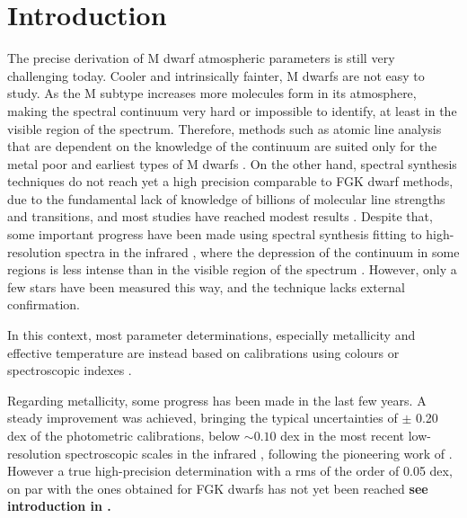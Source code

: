 \documentclass{aa}
\begin{document}

   \maketitle


\section{Introduction}

The precise derivation of M dwarf atmospheric parameters is still very challenging today. Cooler and intrinsically fainter, M dwarfs are not easy to study. As the M subtype increases more molecules form in its atmosphere, making the spectral continuum very hard or impossible to identify, at least in the visible region of the spectrum. Therefore, methods such as atomic line analysis that are dependent on the knowledge of the continuum are suited only for the metal poor and earliest types of M dwarfs \citep[e.g.][]{Woolf-2005,Woolf-2006}. On the other hand, spectral synthesis techniques do not reach yet a high precision comparable to FGK dwarf methods, due to the fundamental lack of knowledge of billions of molecular line strengths and transitions, and most studies have reached modest results \citep[e.g.][]{Valenti-1998,Bean-2006a}. Despite that, some important progress have been made using spectral synthesis fitting to high-resolution spectra in the infrared \citep{Onehag-2012}, where the depression of the continuum in some regions is less intense than in the visible region of the spectrum \citep[e.g.][]{Rajpurohit-2013b}. However, only a few stars have been measured this way, and the technique lacks external confirmation. 

In this context, most parameter determinations, especially metallicity and effective temperature are instead based on calibrations using colours \citep[e.g.][]{Bonfils-2005,Johnson-2009,Schlaufman-2010,Johnson-2012,Neves-2012} or spectroscopic indexes \citep[e.g.][]{Rojas-Ayala-2010,Rojas-Ayala-2012, Mann-2013a,Mann-2013b,Newton-2013}.

Regarding metallicity, some progress has been made in the last few years. A steady improvement was achieved, bringing the typical uncertainties of $\pm$ 0.20 dex of the photometric calibrations, below $\sim 0.10$ dex in the most recent low-resolution spectroscopic scales in the infrared \cite[e.g.][]{Rojas-Ayala-2012,Mann-2013a,Newton-2013}, following the pioneering work of \citet{Rojas-Ayala-2010}. However a true high-precision determination with a rms of the order of 0.05 dex, on par with the ones obtained for FGK dwarfs \citep[e.g.][]{Santos-2004b,Sousa-2007} has not yet been reached \textbf{see introduction in \citet{Neves-2012}.}
 
\end{document}
